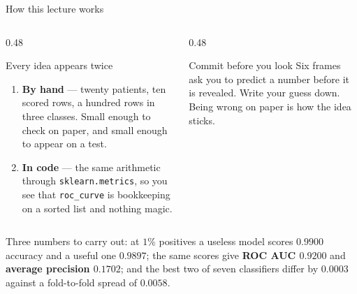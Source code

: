 \documentclass[aspectratio=169]{beamer}
\begin{document}
\begin{frame}[shrink=6]{How this lecture works}
  \begin{columns}[T]
    \begin{column}{0.48\textwidth}
      \begin{block}{Every idea appears twice}
        \begin{enumerate}
          \item \textbf{By hand} --- twenty patients, ten scored rows, a
            hundred rows in three classes. Small enough to check on paper, and
            small enough to appear on a test.
          \item \textbf{In code} --- the same arithmetic through
            \texttt{sklearn.metrics}, so you see that \texttt{roc\_curve} is
            bookkeeping on a sorted list and nothing magic.
        \end{enumerate}
      \end{block}
    \end{column}
    \begin{column}{0.48\textwidth}
      \begin{alertblock}{Commit before you look}
        Six frames ask you to predict a number before it is revealed. Write
        your guess down. Being wrong on paper is how the idea sticks.
      \end{alertblock}
    \end{column}
  \end{columns}
  \vspace{0.4em}
  \begin{center}
    \small Three numbers to carry out: at $1\%$ positives a useless model
    scores \textbf{$0.9900$} accuracy and a useful one \textbf{$0.9897$};
    the same scores give \textbf{ROC AUC $0.9200$} and \textbf{average
    precision $0.1702$}; and the best two of seven classifiers differ by
    \textbf{$0.0003$} against a fold-to-fold spread of \textbf{$0.0058$}.
  \end{center}
\end{frame}
\end{document}
